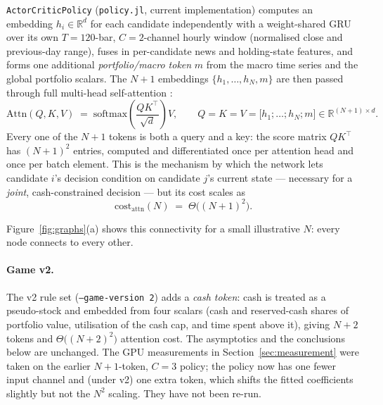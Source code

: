 \documentclass[11pt]{article}
\newcommand{\code}[1]{\texttt{#1}}
\begin{document}
\code{ActorCriticPolicy} (\code{policy.jl}, current implementation) computes
an embedding $h_i \in \mathbb{R}^d$ for each candidate independently with a
weight-shared GRU over its own $T{=}120$-bar, $C{=}2$-channel hourly window (normalised close and previous-day range),
fuses in per-candidate news and holding-state features, and forms one
additional \emph{portfolio/macro token} $m$ from the macro time series and
the global portfolio scalars. The $N{+}1$ embeddings
$\{h_1,\dots,h_N,m\}$ are then passed through full multi-head self-attention
\citep{vaswani2017attention}:
\begin{equation}
  \mathrm{Attn}(Q,K,V) \;=\; \mathrm{softmax}\!\left(\frac{QK^\top}{\sqrt{d}}\right)V,
  \qquad Q=K=V=\big[h_1;\dots;h_N;m\big] \in \mathbb{R}^{(N+1)\times d}.
  \label{eq:full-self-attn}
\end{equation}
Every one of the $N{+}1$ tokens is both a query and a key: the score matrix
$QK^\top$ has $(N{+}1)^2$ entries, computed and differentiated once per
attention head and once per batch element. This is the mechanism by which
the network lets candidate $i$'s decision condition on candidate $j$'s
current state --- necessary for a \emph{joint}, cash-constrained decision --- but
its cost scales as
\begin{equation}
  \mathrm{cost}_{\text{attn}}(N) \;=\; \Theta\!\big((N+1)^2\big).
  \label{eq:on2}
\end{equation}

Figure~\ref{fig:graphs}(a) shows this connectivity for a small illustrative
$N$: every node connects to every other.

\paragraph{Game v2.} The v2 rule set (\code{--game-version 2}) adds a
\emph{cash token}: cash is treated as a pseudo-stock and embedded from four
scalars (cash and reserved-cash shares of portfolio value, utilisation of the
cash cap, and time spent above it), giving $N{+}2$ tokens and
$\Theta\big((N+2)^2\big)$ attention cost. The asymptotics and the conclusions
below are unchanged. The GPU measurements in Section~\ref{sec:measurement}
were taken on the earlier $N{+}1$-token, $C{=}3$ policy; the policy now has
one fewer input channel and (under v2) one extra token, which shifts the fitted
coefficients slightly but not the $N^2$ scaling. They have not been re-run.
\end{document}
